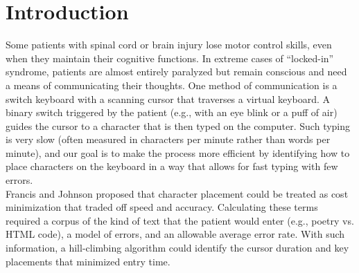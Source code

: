 \documentclass{sig-alternate}
\begin{document}


\section{Introduction}
Some patients with spinal cord or brain injury lose motor control skills, even when they maintain their cognitive functions. In extreme cases of ``locked-in'' syndrome, patients are almost entirely paralyzed but remain conscious and need a means of communicating their thoughts. One method of communication is a switch keyboard with a scanning cursor that traverses a virtual keyboard. A binary switch  triggered by the patient (e.g., with an eye blink or a puff of air) guides the cursor to a character that is then typed on the computer.  Such typing is very slow (often measured in characters per minute rather than words per minute), and our goal is to make the process more efficient by identifying how to place characters on the keyboard in a way that allows for fast typing with few errors.\\
Francis and Johnson \cite{Francis2011} proposed that character placement could be treated as cost minimization that traded off speed and accuracy. Calculating these terms required a corpus of the kind of text that the patient would enter (e.g., poetry vs. HTML code), a model of errors, and an allowable average error rate. With such information, a hill-climbing algorithm could identify the cursor duration and key placements that minimized entry time.\\ 
\end{document}
